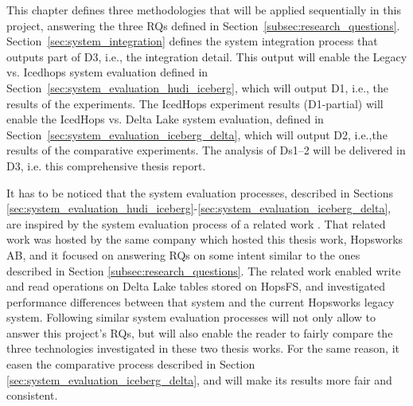This chapter defines three methodologies that will be applied sequentially in this project, answering the three \glspl{RQ} defined in Section~\ref{subsec:research_questions}. Section~\ref{sec:system_integration} defines the system integration process that outputs part of \gls{D}3, i.e., the integration detail. This output will enable the Legacy vs. Icedhops system evaluation defined in Section~\ref{sec:system_evaluation_hudi_iceberg}, which will output \gls{D}1, i.e., the results of the experiments. The IcedHops experiment results (\gls{D}1-partial) will enable the IcedHops vs. Delta Lake system evaluation, defined in Section~\ref{sec:system_evaluation_iceberg_delta}, which will output \gls{D}2, i.e.,the results of the comparative experiments. The analysis of \glspl{D}1--2 will be delivered in \gls{D}3, i.e. this comprehensive thesis report.

It has to be noticed that the system evaluation processes, described in Sections \ref{sec:system_evaluation_hudi_iceberg}-\ref{sec:system_evaluation_iceberg_delta}, are inspired by the system evaluation process of a related work \cite{manfrediReducingReadWrite2024}. That related work was hosted by the same company which hosted this thesis work, Hopsworks AB, and it focused on answering \glspl{RQ} on some intent similar to the ones described in Section \ref{subsec:research_questions}. The related work enabled write and read operations on Delta Lake tables stored on \gls{HopsFS}, and investigated performance differences between that system and the current Hopsworks legacy system. Following similar system evaluation processes will not only allow to answer this project's \glspl{RQ}, but will also enable the reader to fairly compare the three technologies investigated in these two thesis works. For the same reason, it easen the comparative process described in Section \ref{sec:system_evaluation_iceberg_delta}, and will make its results more fair and consistent.